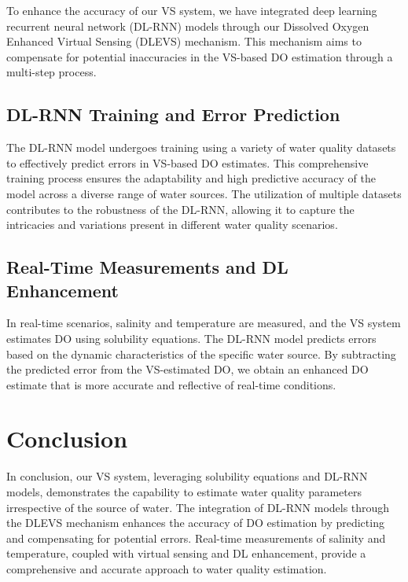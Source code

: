 \documentclass[a4paper, 11pt]{article}
\begin{document}
	To enhance the accuracy of our VS system, we have integrated deep learning recurrent neural network (DL-RNN) models through our Dissolved Oxygen Enhanced Virtual Sensing (DLEVS) mechanism. This mechanism aims to compensate for potential inaccuracies in the VS-based DO estimation through a multi-step process.	

	\subsection*{DL-RNN Training and Error Prediction}
	
	The DL-RNN model undergoes training using a variety of water quality datasets to effectively predict errors in VS-based DO estimates. This comprehensive training process ensures the adaptability and high predictive accuracy of the model across a diverse range of water sources. The utilization of multiple datasets contributes to the robustness of the DL-RNN, allowing it to capture the intricacies and variations present in different water quality scenarios.
		
	\subsection*{Real-Time Measurements and DL Enhancement}
	
	In real-time scenarios, salinity and temperature are measured, and the VS system estimates DO using solubility equations. The DL-RNN model predicts errors based on the dynamic characteristics of the specific water source. By subtracting the predicted error from the VS-estimated DO, we obtain an enhanced DO estimate that is more accurate and reflective of real-time conditions.
	
	\section*{Conclusion}
	
	In conclusion, our VS system, leveraging solubility equations and DL-RNN models, demonstrates the capability to estimate water quality parameters irrespective of the source of water. The integration of DL-RNN models through the DLEVS mechanism enhances the accuracy of DO estimation by predicting and compensating for potential errors. Real-time measurements of salinity and temperature, coupled with virtual sensing and DL enhancement, provide a comprehensive and accurate approach to water quality estimation.
	
	
\end{document}
